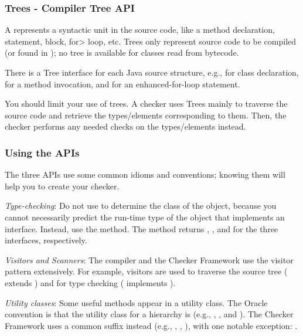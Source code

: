 \subsubsection{Trees - Compiler Tree API\label{javac-trees}}

A  represents a syntactic unit in the source code,
like a method declaration, statement, block, \<for> loop, etc. Trees only
represent source code to be compiled (or found in );
no tree is available for classes read from bytecode.

There is a Tree interface for each Java source structure, e.g.,
 for class declaration, 
for a method invocation, and  for an enhanced-for-loop
statement.

You should limit your use of trees. A checker uses Trees mainly to
traverse the source code and retrieve the types/elements corresponding to
them.  Then, the checker performs any needed checks on the types/elements instead.


\subsubsection{Using the APIs\label{using-the-apis}}

The three APIs use some common idioms and conventions; knowing them will
help you to create your checker.

\emph{Type-checking}:
Do not use  to determine the class of the object,
because you cannot necessarily predict the run-time type of the object that
implements an interface.  Instead, use the  method.  The
method returns ,
, and 
for the three interfaces, respectively.

\emph{Visitors and Scanners}:
The compiler and the Checker Framework use the visitor pattern
extensively. For example, visitors are used to traverse the source tree
( extends
) and for type
checking ( implements
).

\emph{Utility classes}:
Some useful methods appear in a utility class.  The Oracle convention is that
the utility class for a  hierarchy is  (e.g.,
, , and
).  The Checker Framework uses a common
 suffix instead (e.g., ,
, ), with one
notable exception: .


